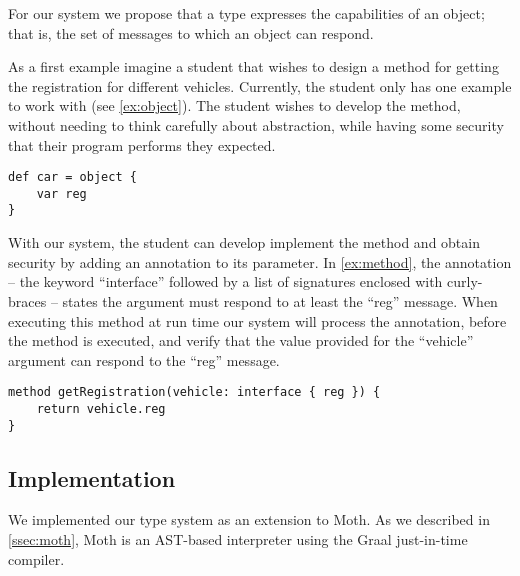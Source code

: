 For our system we propose that a type expresses the capabilities of an object;
that is, the set of messages to which an object can respond.

As a first example imagine a student that wishes to 
design a method for getting the registration for different vehicles. 
Currently, the student only has one example to work with (see \cref{ex:object}).
The student wishes to develop the method,
without needing to think carefully about abstraction,
while having some security that their program
performs they expected.

\begin{lstlisting}[label={ex:object},caption={An object literal with a field named ``reg'' and assigns it to the ``car'' variable.}]
def car = object {
    var reg
}
\end{lstlisting}

With our system, the student can develop implement the method and 
obtain security by adding an annotation to its parameter. 
In \cref{ex:method}, the annotation
-- the keyword ``interface'' followed by a list of signatures enclosed with curly-braces --
states the argument must respond to at least the ``reg'' message. 
When executing this method at run time
our system will process the annotation,
before the method is executed,
and verify that the value provided for the ``vehicle'' argument 
can respond to the ``reg'' message.

\begin{lstlisting}[label={ex:method},caption={A method with its argument annotated with an interface literal, stating that the value must respond to at least the ``reg'' message.}]
method getRegistration(vehicle: interface { reg }) {
    return vehicle.reg
}
\end{lstlisting}



\subsection{Implementation} 
\label{sec:implementation} 


We implemented our type system as an extension to Moth.
As we described in \cref{ssec:moth},
Moth is an AST-based interpreter
using the Graal just-in-time compiler\citep{Wurthinger:2017:PPE}.



